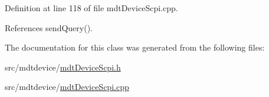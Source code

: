 Definition at line 118 of file mdt\-Device\-Scpi.\-cpp.



References send\-Query().



The documentation for this class was generated from the following files\-:\begin{DoxyCompactItemize}
\item 
src/mdtdevice/\hyperlink{mdt_device_scpi_8h}{mdt\-Device\-Scpi.\-h}\item 
src/mdtdevice/\hyperlink{mdt_device_scpi_8cpp}{mdt\-Device\-Scpi.\-cpp}\end{DoxyCompactItemize}
